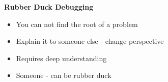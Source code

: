 \textbf{Rubber Duck Debugging}
\begin{itemize}
    \item You can not find the root of a problem
    \item Explain it to someone else - change perspective
    \item Requires deep understanding
    \item Someone - can be rubber duck
\end{itemize}

























